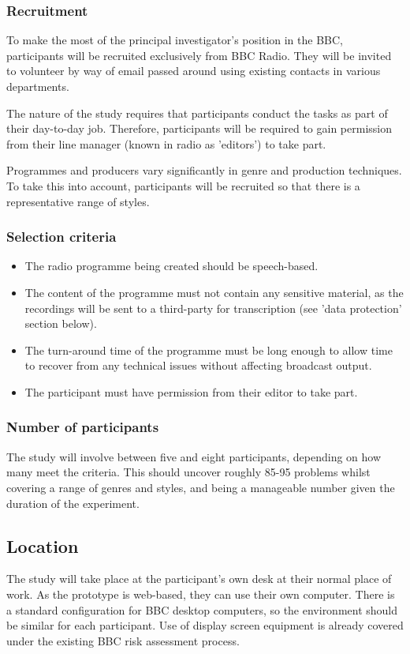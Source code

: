 \subsubsection{Recruitment}
To make the most of the principal investigator's position in the BBC,
participants will be recruited exclusively from BBC Radio. They will be invited
to volunteer by way of email passed around using existing contacts in various
departments. 

The nature of the study requires that participants conduct the tasks as part of
their day-to-day job. Therefore, participants will be required to gain
permission from their line manager (known in radio as 'editors') to take part.

Programmes and producers vary significantly in genre and production techniques.
To take this into account, participants will be recruited so that there is a
representative range of styles.

\subsubsection{Selection criteria}
\begin{itemize}
\item The radio programme being created should be speech-based.
\item The content of the programme must not contain any sensitive material, as
the recordings will be sent to a third-party for transcription (see 'data
protection' section below).
\item The turn-around time of the programme must be long enough to allow time
to recover from any technical issues without affecting broadcast output.
\item The participant must have permission from their editor to take part.
\end{itemize}

\subsubsection{Number of participants}
The study will involve between five and eight participants, depending on how
many meet the criteria. This should uncover roughly 85-95%
problems \cite{Nielsen1993} whilst covering a range of genres and styles, and
being a manageable number given the duration of the experiment.

\subsection{Location}
The study will take place at the participant's own desk at their normal place
of work. As the prototype is web-based, they can use their own computer. There
is a standard configuration for BBC desktop computers, so the environment
should be similar for each participant. Use of display screen equipment is
already covered under the existing BBC risk assessment process.


